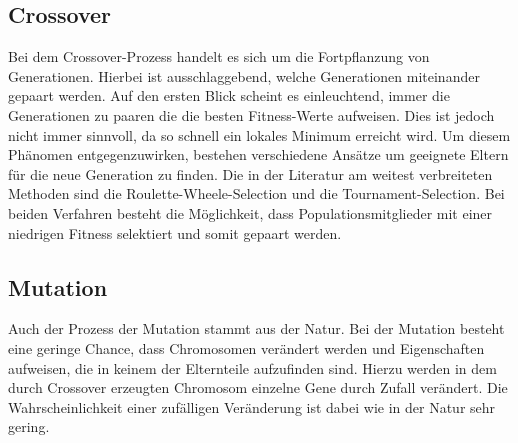 \subsection{Crossover}
\label{chap:grundlagen_cossover}
Bei dem Crossover-Prozess handelt es sich um die Fortpflanzung von Generationen. Hierbei ist ausschlaggebend, welche Generationen miteinander gepaart werden. Auf den ersten Blick scheint es einleuchtend, immer die Generationen zu paaren die die besten Fitness-Werte aufweisen. Dies ist jedoch nicht immer sinnvoll, da so schnell ein lokales Minimum erreicht wird. Um diesem Phänomen entgegenzuwirken, bestehen verschiedene Ansätze um geeignete Eltern für die neue Generation zu finden.\cite{davis1991handbook}
Die in der Literatur am weitest verbreiteten Methoden sind die Roulette-Wheele-Selection und die Tournament-Selection.\cite{zhong2005comparison} Bei beiden Verfahren besteht die Möglichkeit, dass Populationsmitglieder mit einer niedrigen Fitness selektiert und somit gepaart werden.

\subsection{Mutation}
Auch der Prozess der Mutation stammt aus der Natur. Bei der Mutation besteht eine geringe Chance, dass Chromosomen verändert werden und Eigenschaften aufweisen, die in keinem der Elternteile aufzufinden sind. Hierzu werden in dem durch Crossover erzeugten Chromosom einzelne Gene durch Zufall verändert. Die Wahrscheinlichkeit einer zufälligen Veränderung ist dabei wie in der Natur sehr gering.\cite{davis1991handbook}

